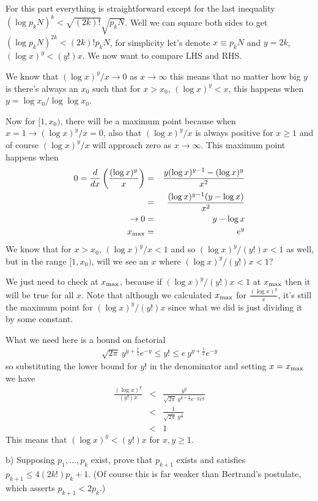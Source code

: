 \documentclass[aps,preprint,preprintnumbers,nofootinbib,showpacs,prd]{revtex4-1}
\newcommand{\nbea}{\begin{eqnarray*}}
\newcommand{\neea}{\end{eqnarray*}}
\begin{document}
For this part everything is straightforward except for the last inequality $ (\log p_k N)^k < \sqrt{(2k)!} \sqrt{p_k N}$. Well we can square both sides to get $ (\log p_k N)^{2k} < (2k)! p_k N$, for simplicity let's denote $x \equiv p_kN$ and $y = 2k$, $(\log x)^y < (y!) x$. We now want to compare LHS and RHS.

We know that $(\log x)^y/x \to 0$ as $x\to\infty$ this means that no matter how big $y$ is there's always an $x_0$ such that for $x > x_0$,  $(\log x)^y < x$, this happens when $y = \log x_0/\log\log x_0$.

Now for $[1,x_0)$, there will be a maximum point because when $x=1 \to (\log x)^y/x = 0$, also that $(\log x)^y/x$ is always positive for $x \ge 1$ and of course $(\log x)^y/x$ will approach zero as $x\to\infty$. This maximum point happens when
%
\nbea
0 = \frac{d}{dx} \left ( \frac{(\log x)^y}{x} \right ) & = & \frac{y(\log x)^{y-1} - (\log x)^y}{x^2} \\
& = & \frac{(\log x)^{y-1}(y - \log x)}{x^2} \\
\to 0 & = & y - \log x \\
x_{\rm max} & = & e^y 
\neea
%
We know that for $x > x_0$, $(\log x)^y/x < 1$ and so $(\log x)^y/(y!)x < 1$ as well, but in the range $[1,x_0)$, will we see an $x$ where $(\log x)^y/(y!)x < 1$?

We just need to check at $x_{\rm max}$, because if $(\log x)^y/(y!)x < 1$ at $x_{\rm max}$ then it will be true for all $x$. Note that although we calculated $x_{\rm max}$ for $\frac{(\log x)^y}{x}$, it's still the maximum point for $(\log x)^y/(y!)x$ since what we did is just dividing it by some constant.

What we need here is a bound on factorial
%
\nbea
\sqrt{2\pi} ~ y^{y + \frac{1}{2}} e^{-y} \le y! \le e ~ y^{y + \frac{1}{2}} e^{-y} 
\neea
%
so substituting the lower bound for $y!$ in the denominator and setting $x = x_{\rm max}$ we have
%
\nbea
\frac{(\log x)^y}{(y!) x} & < & \frac{y^y}{\sqrt{2\pi} ~ y^{y + \frac{1}{2}} e^{-y} e^y} \\
& < & \frac{1}{\sqrt{2\pi} ~ y^{\frac{1}{2}}} \\
& < & 1
\neea
%
This means that $(\log x)^y < (y!) x$ for $x, y \ge 1$.

b) Supposing $p_1 , \dots , p_k$ exist, prove that $p_{k+1}$ exists and satisfies $p_{k+1} \le 4(2k!)p_k + 1$. (Of course this is far weaker than Bertrand’s postulate, which asserts $p_{k+1} < 2p_k$.)
\end{document}
